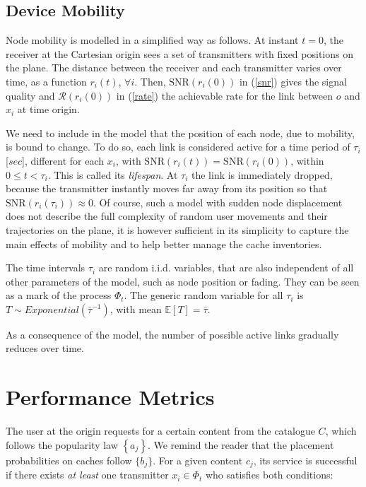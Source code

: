 \documentclass[conference]{IEEEtran}
\begin{document}
\subsection{Device Mobility}

Node mobility is modelled in a simplified way as follows. At instant $t=0$, the receiver at the Cartesian origin sees a set of transmitters with fixed positions on the plane. The distance between the receiver and each transmitter varies over time, as a function $r_i(t)$, $\forall i$. Then, $\mathrm{SNR}(r_i(0))$ in (\ref{snr}) gives the signal quality and $\mathcal{R}(r_i(0))$ in (\ref{rate}) the achievable rate for the link between $o$ and $x_i$ at time origin. 

We need to include in the model that the position of each node, due to mobility, is bound to change. To do so, each link is considered active for a time period of $\tau_i$ [$sec$], different for each $x_i$, with $\mathrm{SNR}(r_i(t))=\mathrm{SNR}(r_i(0))$, within $0\leq t < \tau_i$. This is called its \textit{lifespan}. At $\tau_i$ the link is immediately dropped, because the transmitter instantly moves far away from its position so that $\mathrm{SNR}(r_i(\tau_i))\approx 0$. Of course, such a model with sudden node displacement does not describe the full complexity of random user movements and their trajectories on the plane, it is however sufficient in its simplicity to capture the main effects of mobility and to help better manage the cache inventories. 

The time intervals $\tau_i$ are random i.i.d. variables, that are also independent of all other parameters of the model, such as node position or fading. They can be seen as a mark of the process $\Phi_t$. The generic random variable for all $\tau_i$ is $T\sim Exponential(\bar{\tau}^{-1})$, with mean $\mathbb{E}\left[T\right] = \bar{\tau}$.

As a consequence of the model, the number of possible active links gradually reduces over time.




\section{Performance Metrics}
\label{secIII}

The user at the origin requests for a certain content from the catalogue $C$, which follows the popularity law $\left\{a_j\right\}$. We remind the reader that the placement probabilities on caches follow $\{b_j\}$. For a given content $c_j$, its service is successful if there exists \textit{at least} one transmitter $x_i\in\Phi_t$ who satisfies both conditions:
\end{document}
